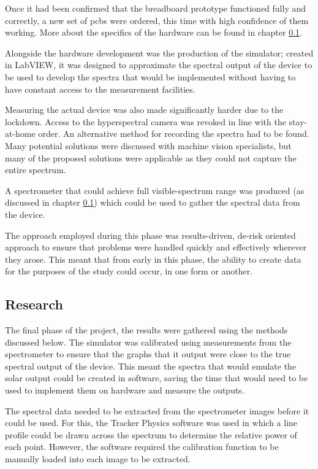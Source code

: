 Once it had been confirmed that the breadboard prototype functioned fully and correctly, a new set of \acrshort{pcbs} were ordered, this time with high confidence of them working. More about the specifics of the hardware can be found in chapter \ref{}.

Alongside the hardware development was the production of the simulator; created in LabVIEW, it was designed to approximate the spectral output of the device to be used to develop the spectra that would be implemented without having to have constant access to the measurement facilities.

Measuring the actual device was also made significantly harder due to the lockdown. Access to the hyperspectral camera was revoked in line with the stay-at-home order. An alternative method for recording the spectra had to be found. Many potential solutions were discussed with machine vision specialists, but many of the proposed solutions were applicable as they could not capture the entire spectrum.

A spectrometer that could achieve full visible-spectrum range was produced (as discussed in chapter \ref{}) which could be used to gather the spectral data from the device.

The approach employed during this phase was results-driven, de-risk oriented approach to ensure that problems were handled quickly and effectively wherever they arose. This meant that from early in this phase, the ability to create data for the purposes of the study could occur, in one form or another.

\subsection{Research}

The final phase of the project, the results were gathered using the methods discussed below. The simulator was calibrated using measurements from the spectrometer to ensure that the graphs that it output were close to the true spectral output of the device. This meant the spectra that would emulate the solar output could be created in software, saving the time that would need to be used to implement them on hardware and measure the outputs.

The spectral data needed to be extracted from the spectrometer images before it could be used. For this, the Tracker Physics software was used in which a line profile could be drawn across the spectrum to determine the relative power of each point. However, the software required the calibration function to be manually loaded into each image to be extracted. 

